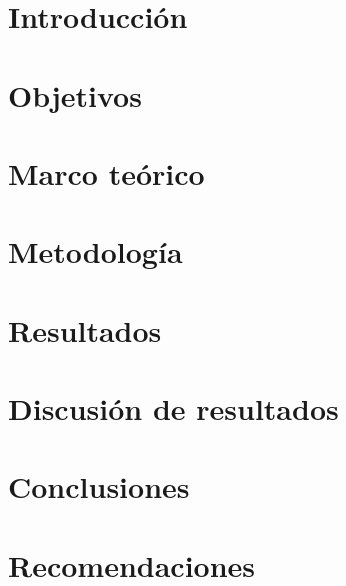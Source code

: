 \documentclass[11pt,letterpaper,oneside]{report}
\begin{document}
\chapter{Introducción}
\label{sec:introduccion}


\chapter{Objetivos}
\label{sec:objetivos}


\chapter{Marco teórico}
\label{sec:marco}


\chapter{Metodología}
\label{sec:metodologia}


\chapter{Resultados}
\label{sec:resultados}


\chapter{Discusión de resultados}
\label{sec:discusiónderesultados}


\chapter{Conclusiones}
\label{sec:conclusiones}


\chapter{Recomendaciones}
\label{sec:recomendaciones}


\nocite{*}


\end{document}
